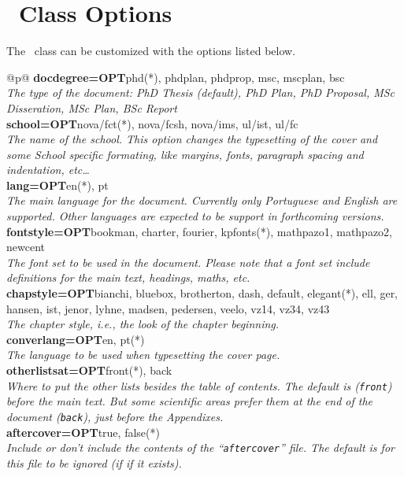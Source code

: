 
\section{\novathesisclass\ Class Options} %
\label{sec:package_options}

The \novathesis\ class can be customized with the options listed below.

\newcommand{\classoption}[3]{\textbf{#1=OPT}\qquad #2\\\qquad\emph{#3}\\}

\noindent
\begin{ctabular}{@{}p{\linewidth}@{}}
  \toprule
  \classoption{docdegree}%
    {phd(*), phdplan, phdprop, msc, mscplan, bsc}%
    {The type of the document: PhD Thesis (default), PhD Plan, PhD Proposal, MSc Disseration, MSc Plan, BSc Report}
    \midrule
  \classoption{school}%
		{nova/fct(*), nova/fcsh, nova/ims, ul/ist, ul/fc}%
    {The name of the school. This option changes the typesetting of the cover and some School specific formating, like margins, fonts, paragraph spacing and indentation, etc…}
    \midrule
  \classoption{lang}%
    {en(*), pt}%
    {The main language for the document.  Currently only Portuguese and English are supported.  Other languages are expected to be support in forthcoming versions.}
    \midrule
  \classoption{fontstyle}%
    {bookman, charter, fourier, kpfonts(*), mathpazo1, mathpazo2, newcent}%
    {The font set to be used in the document.  Please note that a font set include definitions for the main text, headings, maths, etc.}
    \midrule
  \classoption{chapstyle}%
    {bianchi, bluebox, brotherton, dash, default, elegant(*), ell, ger, hansen, ist, jenor, lyhne, madsen, pedersen, veelo, vz14, vz34, vz43}%
    {The chapter style, i.e., the look of the chapter beginning.}
    \midrule
  \classoption{converlang}%
    {en, pt(*)}%
    {The language to be used when typesetting the cover page.}
    \midrule
  \classoption{otherlistsat}%
    {front(*), back}%
    {Where to put the other lists besides the table of contents. The default is (\texttt{front}) before the main text.  But some scientific areas prefer them at the end of the document (\texttt{back}), just before the Appendixes.}
    \midrule
  \classoption{aftercover}%
    {true, false(*)}%
    {Include or don't include the contents of the “\texttt{aftercover}” file. The default is for this file to be ignored (if if it exists).}

\end{ctabular}
